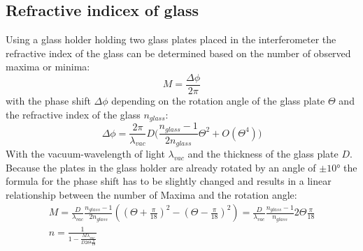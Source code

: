 \subsection{Refractive indicex of glass}
Using a glass holder holding two glass plates placed in the interferometer the refractive index of the glass can be determined based on the number of observed maxima or minima:
\begin{equation*}
M=\frac{\Delta \phi}{2\pi}
\end{equation*}
with the phase shift $\Delta \phi$ depending on the rotation angle of the glass plate $\Theta$ and the refractive index of the glass $n_{glass}$:
\begin{equation}
\Delta \phi=\frac{2\pi}{\lambda_{vac}}D\bigl( \frac{n_{glass}-1}{2n_{glass}}\Theta^2+O(\Theta^4)\bigr)
\end{equation}
With the vacuum-wavelength of light $\lambda_{vac}$ and the thickness of the glass plate $D$. Because the plates in the glass holder are already rotated by an angle of $\pm10°$ the formula for the phase shift has to be slightly changed and results in a linear relationship between the number of Maxima and the rotation angle:
\begin{gather}
M=\frac{D}{\lambda_{vac}}\frac{n_{glass}-1}{2n_{glass}}((\Theta+\frac{\pi}{18})^2-(\Theta-\frac{\pi}{18})^2)=\frac{D}{\lambda_{vac}}\frac{n_{glass}-1}{n_{glass}}2\Theta\frac{\pi}{18} \\
n=\frac{1}{1-\frac{M\lambda_{vac}}{D2\Theta\frac{\pi}{18}}}
\end{gather}
